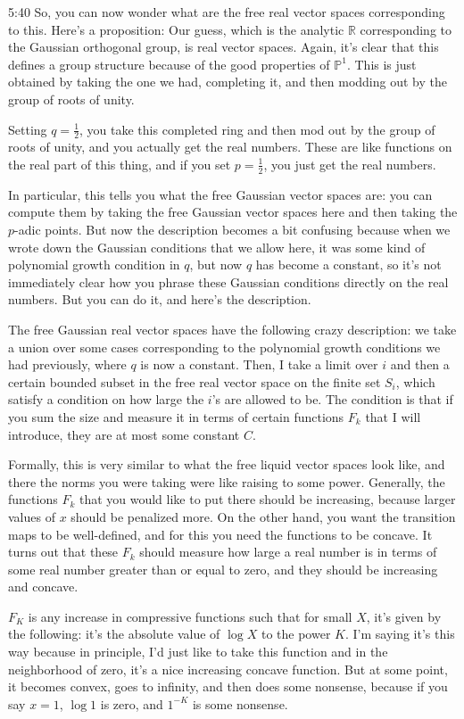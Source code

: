 \begin{unfinished}{5:40}
So, you can now wonder what are the free real vector spaces corresponding to this. Here's a proposition: Our guess, which is the analytic $\mathbb{R}$ corresponding to the Gaussian orthogonal group, is real vector spaces. Again, it's clear that this defines a group structure because of the good properties of $\mathbb{P}^1$. This is just obtained by taking the one we had, completing it, and then modding out by the group of roots of unity.

Setting $q = \frac{1}{2}$, you take this completed ring and then mod out by the group of roots of unity, and you actually get the real numbers. These are like functions on the real part of this thing, and if you set $p = \frac{1}{2}$, you just get the real numbers.

In particular, this tells you what the free Gaussian vector spaces are: you can compute them by taking the free Gaussian vector spaces here and then taking the
$p$-adic points. But now the description becomes a bit confusing because when we wrote down the Gaussian conditions that we allow here, it was some kind of polynomial growth condition in $q$, but now $q$ has become a constant, so it's not immediately clear how you phrase these Gaussian conditions directly on the real numbers. But you can do it, and here's the description.

The free Gaussian real vector spaces have the following crazy description: we take a union over some cases corresponding to the polynomial growth conditions we had previously, where $q$ is now a constant. Then, I take a limit over $i$ and then a certain bounded subset in the free real vector space on the finite set $S_i$, which satisfy a condition on how large the $i$'s are allowed to be. The condition is that if you sum the size and measure it in terms of certain functions $F_k$ that I will introduce, they are at most some constant $C$.

Formally, this is very similar to what the free liquid vector spaces look like, and there the norms you were taking were like raising to some power. Generally, the functions $F_k$ that you would like to put there should be increasing, because larger values of $x$ should be penalized more. On the other hand, you want the transition maps to be well-defined, and for this you need the functions to be concave. It turns out that these $F_k$ should measure how large a real number is in terms of some real number greater than or equal to zero, and they should be increasing and concave.


$F_K$ is any increase in compressive functions such that for small $X$, it's given by the following: it's the absolute value of $\log X$ to the power $K$. I'm saying it's this way because in principle, I'd just like to take this function and in the neighborhood of zero, it's a nice increasing concave function. But at some point, it becomes convex, goes to infinity, and then does some nonsense, because if you say $x = 1$, $\log 1$ is zero, and $1^{-K}$ is some nonsense. 


\end{unfinished}
